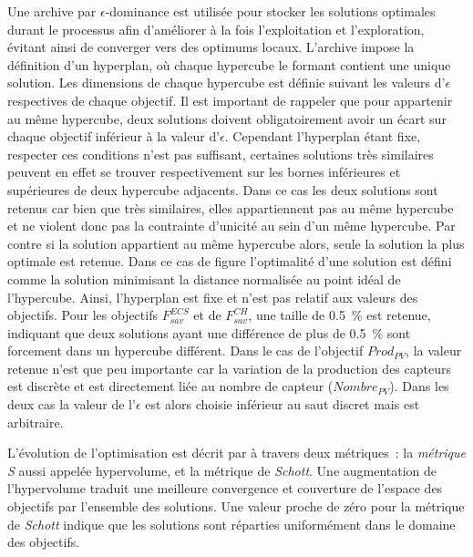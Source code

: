 Une archive par $\epsilon$-dominance est utilisée pour stocker les solutions optimales
durant le processus afin d’améliorer à la fois l’exploitation et l’exploration, évitant
ainsi de converger vers des optimums locaux. L’archive impose la définition d’un
hyperplan, où chaque hypercube le formant contient une unique solution. Les dimensions de chaque
hypercube est définie suivant les valeurs d’$\epsilon$ respectives de chaque objectif.
Il est important de rappeler que pour appartenir au même hypercube, deux solutions
doivent obligatoirement avoir un écart sur chaque objectif inférieur à la valeur d’$\epsilon$.
Cependant l’hyperplan étant fixe, respecter ces conditions n’est pas suffisant, certaines solutions
très similaires peuvent en effet se trouver respectivement sur les bornes inférieures
et supérieures de deux hypercube adjacents. Dans ce cas les deux solutions sont retenus
car bien que très similaires, elles appartiennent pas au même hypercube et ne violent donc
pas la contrainte d’unicité au sein d’un même hypercube.
Par contre si la solution appartient au même hypercube alors, seule la solution la plus
optimale est retenue. Dans ce cas de figure l’optimalité d’une solution est défini
comme la solution minimisant la distance normalisée au point idéal de l’hypercube.
Ainsi, l’hyperplan est fixe et n’est pas relatif aux valeurs des objectifs.
Pour les objectifs $F_{sav}^{ECS}$ et de $F_{sav}^{CH}$, une taille de \SI{0.5}{\percent}
est retenue, indiquant que deux solutions ayant une différence de plus de
\SI{0.5}{\percent} sont forcement dans un hypercube différent. Dans le cas de l’objectif $Prod_{PV}$, la
valeur retenue n’est que peu importante car la variation de la production des capteurs
 est discrète et est directement liée au nombre de capteur  ($Nombre_{PV}$).
Dans les deux cas la valeur de l’$\epsilon$ est alors choisie inférieur au saut discret
mais est arbitraire.

L’évolution de l’optimisation est décrit par  à
travers deux métriques~: la \textit{métrique S} aussi appelée hypervolume, et la métrique
de \textit{Schott}. Une augmentation de l’hypervolume traduit une meilleure convergence et
couverture de l’espace des objectifs par l’ensemble des solutions. Une valeur proche de
zéro pour la métrique de \textit{Schott} indique que les solutions sont réparties
uniformément dans le domaine des objectifs.

